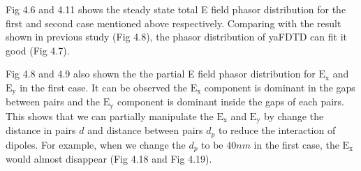 Fig 4.6 and 4.11 shows the steady state total E field phasor distribution for the first and second case mentioned above
respectively. Comparing with the result shown in previous study (Fig 4.8), the phasor distribution of yaFDTD can fit it
good (Fig 4.7).

Fig 4.8 and 4.9 also shown the the partial E field phasor distribution for $\mathrm{E_x}$ and $\mathrm{E_y}$ in the
first case. It can be observed the $\mathrm{E_x}$ component is dominant in the gaps between pairs and the $\mathrm{E_y}$
component is dominant inside the gaps of each pairs. This shows that we can partially manipulate the $\mathrm{E_x}$ and
$\mathrm{E_y}$ by change the distance in pairs $d$ and distance between pairs $d_p$ to reduce the interaction of
dipoles.  For example, when we change the $d_p$ to be $40 nm$ in the first case, the $\mathrm{E_x}$ would almost
disappear (Fig 4.18 and Fig 4.19).
